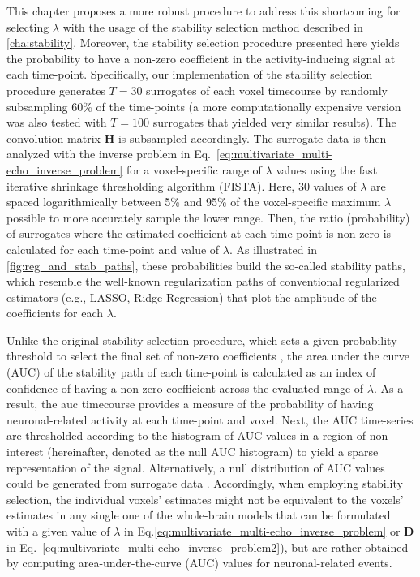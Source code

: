 This chapter proposes a more robust procedure to address this shortcoming 
for selecting $\lambda$ with the usage of the stability selection method
\citep{Meinshausen2010Stabilityselection} described in \cref{cha:stability}. 
Moreover, the stability selection procedure presented here yields the probability 
to have a non-zero coefficient in the activity-inducing signal at each time-point. 
Specifically, our implementation of the stability selection procedure generates $T=30$ 
surrogates of each voxel timecourse by randomly subsampling 60\% of the time-points (a 
more computationally expensive version was also tested with $T=100$ surrogates that
yielded very similar results). The convolution matrix $\mathbf{H}$ is subsampled
accordingly. The surrogate data is then analyzed with the inverse problem in
Eq.~\eqref{eq:multivariate_multi-echo_inverse_problem} for a voxel-specific
range of $\lambda$ values using the fast iterative shrinkage thresholding
algorithm (FISTA). Here, 30 values of $\lambda$ are spaced logarithmically
between 5\% and 95\% of the voxel-specific maximum $\lambda$ possible to more
accurately sample the lower range. Then, the ratio (probability) of surrogates
where the estimated coefficient at each time-point is non-zero is calculated for
each time-point and value of $\lambda$.  As illustrated in
\cref{fig:reg_and_stab_paths}, these probabilities build the so-called stability
paths, which resemble the well-known regularization paths of conventional
regularized estimators (e.g., LASSO, Ridge Regression) that plot the amplitude
of the coefficients for each $\lambda$. 

Unlike the original stability selection procedure, which sets a given
probability threshold to select the final set of non-zero coefficients
\citep{Meinshausen2010Stabilityselection}, the area under the curve (AUC) of the
stability path of each time-point is calculated as an index of confidence of
having a non-zero coefficient across the evaluated range of $\lambda$. As a
result, the \acrshort*{auc} timecourse provides a measure of the probability of
having neuronal-related activity at each time-point and voxel. Next, the AUC
time-series are thresholded according to the histogram of AUC values in a region
of non-interest (hereinafter, denoted as the null AUC histogram) to yield a
sparse representation of the signal. Alternatively, a null distribution of AUC
values could be generated from surrogate data
\citep{Liegeois2021Interpretingnullmodels}. Accordingly, when employing
stability selection, the individual voxels' estimates might not be equivalent to
the voxels' estimates in any single one of the whole-brain models that can be
formulated with a given value of $\lambda$ in
Eq.\eqref{eq:multivariate_multi-echo_inverse_problem} or $\mathbf{D}$ in
Eq.~\eqref{eq:multivariate_multi-echo_inverse_problem2}), but are rather
obtained by computing area-under-the-curve (AUC) values for neuronal-related
events.

